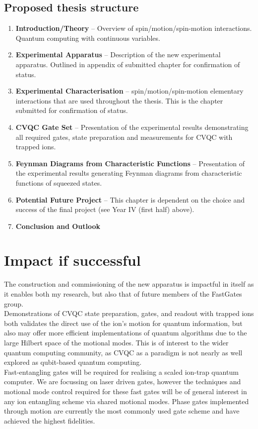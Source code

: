 \documentclass[12pt]{article}
\begin{document}
\subsection*{Proposed thesis structure}
\begin{enumerate}
    \item \textbf{Introduction/Theory} -- Overview of spin/motion/spin-motion interactions. Quantum computing with continuous variables. 
    \item \textbf{Experimental Apparatus} -- Description of the new experimental apparatus. Outlined in appendix of submitted chapter for confirmation of status.
    \item \textbf{Experimental Characterisation} -- spin/motion/spin-motion elementary interactions that are used throughout the thesis. This is the chapter submitted for confirmation of status.
    \item \textbf{CVQC Gate Set} -- Presentation of the experimental results demonstrating all required gates, state preparation and measurements for CVQC with trapped ions.
    \item \textbf{Feynman Diagrams from Characteristic Functions} -- Presentation of the experimental results generating Feynman diagrams from characteristic functions of squeezed states.
    \item \textbf{Potential Future Project} -- This chapter is dependent on the choice and success of the final project (see Year IV (first half) above).
    \item \textbf{Conclusion and Outlook} 
\end{enumerate}


\section{Impact if successful}
\noindent The construction and commissioning of the new apparatus is impactful in itself as it enables both my research, but also that of future members of the FastGates group.\\

\noindent Demonstrations of CVQC state preparation, gates, and readout with trapped ions both validates the direct use of the ion's motion for quantum information, but also may offer more efficient implementations of quantum algorithms due to the large Hilbert space of the motional modes. This is of interest to the wider quantum computing community, as CVQC as a paradigm is not nearly as well explored as qubit-based quantum computing.\\

\noindent Fast-entangling gates will be required for realising a scaled ion-trap quantum computer. We are focussing on laser driven gates, however the techniques and motional mode control required for these fast gates will be of general interest in any ion entangling scheme via shared motional modes. 
Phase gates implemented through motion are currently the most commonly used gate scheme and have achieved the highest fidelities.\\
\end{document}
